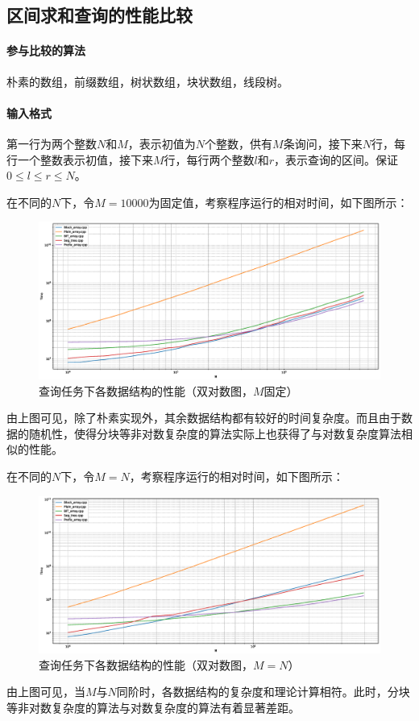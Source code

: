 \documentclass{cjc}
\begin{document}
\subsection{区间求和查询的性能比较}

\paragraph{参与比较的算法}朴素的数组，前缀数组，树状数组，块状数组，线段树。
\paragraph{输入格式} 第一行为两个整数$N$和$M$，表示初值为$N$个整数，供有$M$条询问，接下来$N$行，每行一个整数表示初值，接下来$M$行，每行两个整数$l$和$r$，表示查询的区间。保证$0\leq l \leq r \leq N$。

在不同的$N$下，令$M=10000$为固定值，考察程序运行的相对时间，如下图所示：
\begin{figure}[H]
  \centering
  \includegraphics[width=\linewidth]{images/performance1.eps}
  \caption{查询任务下各数据结构的性能（双对数图，$M$固定）}
\end{figure}
由上图可见，除了朴素实现外，其余数据结构都有较好的时间复杂度。而且由于数据的随机性，使得分块等非对数复杂度的算法实际上也获得了与对数复杂度算法相似的性能。

在不同的$N$下，令$M=N$，考察程序运行的相对时间，如下图所示：
\begin{figure}[H]
  \centering
  \includegraphics[width=\linewidth]{images/performance2.eps}
  \caption{查询任务下各数据结构的性能（双对数图，$M=N$）}
\end{figure}
由上图可见，当$M$与$N$同阶时，各数据结构的复杂度和理论计算相符。此时，分块等非对数复杂度的算法与对数复杂度的算法有着显著差距。
\end{document}
